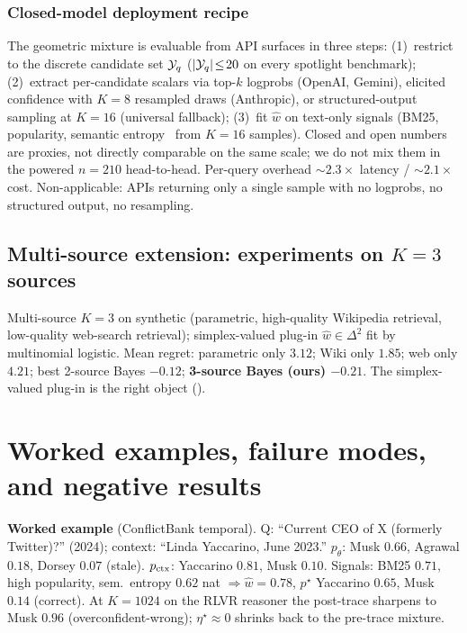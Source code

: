 \subsubsection{Closed-model deployment recipe}
\label{app:closed-model-deployment}

The geometric mixture is evaluable from API surfaces in three
steps: (1)~restrict to the discrete candidate set $\mathcal{Y}_q$
($|\mathcal{Y}_q|\!\le\!20$ on every spotlight benchmark); (2)~extract
per-candidate scalars via top-$k$ logprobs (OpenAI, Gemini),
elicited confidence with $K\!=\!8$ resampled draws (Anthropic),
or structured-output sampling at $K\!=\!16$ (universal fallback);
(3)~fit $\hat w$ on text-only signals (BM25, popularity, semantic
entropy~\citep{kuhn2023semantic} from $K\!=\!16$ samples).  Closed
and open numbers are proxies, not directly comparable on the same
scale; we do not mix them in the powered $n\!=\!210$ head-to-head.
Per-query overhead $\sim\!2.3\!\times$ latency / $\sim\!2.1\!\times$
cost.  Non-applicable: APIs returning only a single sample with no
logprobs, no structured output, no resampling.

\subsection{Multi-source extension: experiments on $K\!=\!3$ sources}
\label{app:multi-source-experiments}

Multi-source $K\!=\!3$ on synthetic (parametric, high-quality
Wikipedia retrieval, low-quality web-search retrieval); simplex-valued
plug-in $\hat w\!\in\!\Delta^2$ fit by multinomial logistic.  Mean
regret: parametric only $3.12$; Wiki only $1.85$; web only $4.21$;
best 2-source Bayes $-0.12$; \textbf{3-source Bayes (ours) $-0.21$}.
The simplex-valued plug-in is the right object
().



\section{Worked examples, failure modes, and negative results}
\label{app:letter-L}\label{app:worked-example}\label{app:negative-results}\label{app:failure-gallery}\label{app:eta-worked}\label{app:worked-saturation}

\textbf{Worked example} (ConflictBank temporal).  Q: ``Current CEO of
X (formerly Twitter)?'' (2024); context: ``Linda Yaccarino, June 2023.''
$p_\theta$: Musk $0.66$, Agrawal $0.18$, Dorsey $0.07$ (stale).
$p_{\mathrm{ctx}}$: Yaccarino $0.81$, Musk $0.10$.
Signals: BM25 $0.71$, high popularity, sem.\ entropy $0.62$ nat
$\Rightarrow\hat w\!=\!0.78$, $p^\star$ Yaccarino $0.65$, Musk $0.14$
(correct).  At $K\!=\!1024$ on the RLVR reasoner the post-trace
sharpens to Musk $0.96$ (overconfident-wrong); $\eta^\star\!\approx\!0$
shrinks back to the pre-trace mixture.

